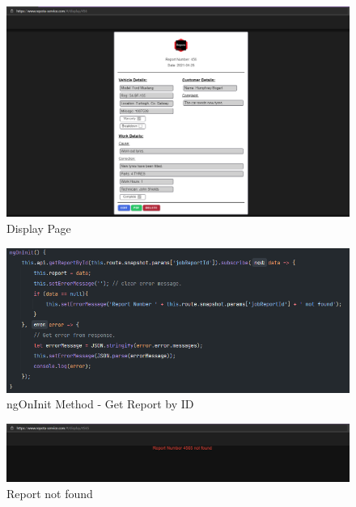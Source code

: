 \begin{figure}[H]
    \caption{Display Page}
    \label{image:displayPage}
    \centering
    \includegraphics[width=1.0\textwidth]{images/repota/UI/display-page.png}
\end{figure}

\begin{figure}[H]
    \caption{ngOnInit Method - Get Report by ID}
    \label{image:ng_reportbyID}
    \centering
    \includegraphics[width=1.0\textwidth]{images/repota/report_pages/display.png}
\end{figure}

\begin{figure}[H]
    \caption{Report not found}
    \label{image:ReportNotFound}
    \centering
    \includegraphics[width=1.0\textwidth]{images/repota/UI/report_not_found.png}
\end{figure}

